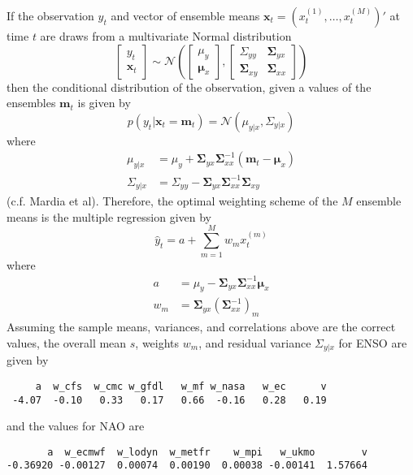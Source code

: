 \documentclass[12pt]{article}
\renewcommand{\vec}[1]{\bm{#1}}
\newcommand{\mat}[1]{\bm{#1}}
\begin{document}
If the observation $y_t$ and vector of ensemble means $\vec{x}_t = (x^{(1)}_t, \dots, x^{(M)}_t)'$ at time $t$ are draws from a multivariate Normal distribution
%
\begin{equation}
\left[\begin{matrix}y_t\\ \vec{x}_t\end{matrix} \right] \sim \mathcal{N}\left( \left[\begin{matrix}\mu_y \\ \vec{\mu}_x \end{matrix}\right], \left[ \begin{matrix}\Sigma_{yy} & \mat{\Sigma}_{yx} \\ \mat{\Sigma}_{xy} & \mat{\Sigma}_{xx} \end{matrix} \right]  \right)
\label{eq:jointdist}
\end{equation}
%
then the conditional distribution of the observation, given a values of the ensembles $\vec{m}_t$ is given by
%
\begin{equation}
p(y_t | \vec{x}_t = \vec{m}_t) = \mathcal{N}(\mu_{y|x}, \Sigma_{y|x})
\label{eq:regrlemma}
\end{equation}
%
where
%
\begin{align}
\mu_{y|x} & = \mu_{y} + \mat{\Sigma}_{yx} \mat{\Sigma}_{xx}^{-1} (\vec{m}_t - \vec{\vec{\mu}}_x)\\
\Sigma_{y|x} & = \Sigma_{yy} - \mat{\Sigma}_{yx} \mat{\Sigma}_{xx}^{-1} \mat{\Sigma}_{xy}
\end{align}
%
(c.f. Mardia et al). 
Therefore, the optimal weighting scheme of the $M$ ensemble means is the multiple regression given by
\begin{equation}
\hat{y}_t = a + \sum_{m=1}^M w_m x^{(m)}_t
\end{equation}
%
where
%
\begin{align}
a & = \mu_y - \mat{\Sigma}_{yx} \mat{\Sigma}_{xx}^{-1} \vec{\mu}_x\\
w_m & = \mat{\Sigma}_{yx}(\mat{\Sigma}_{xx}^{-1})_{m}
\end{align}
%
Assuming the sample means, variances, and correlations above are the correct values, the overall mean $s$, weights $w_m$, and residual variance $\Sigma_{y|x}$ for ENSO are given by
%
\begin{verbatim}
     a  w_cfs  w_cmc w_gfdl   w_mf w_nasa   w_ec      v 
 -4.07  -0.10   0.33   0.17   0.66  -0.16   0.28   0.19 
\end{verbatim}
%
and the values for NAO are
%
\begin{verbatim}
       a  w_ecmwf  w_lodyn  w_metfr    w_mpi   w_ukmo        v 
-0.36920 -0.00127  0.00074  0.00190  0.00038 -0.00141  1.57664 
\end{verbatim}
\end{document}
